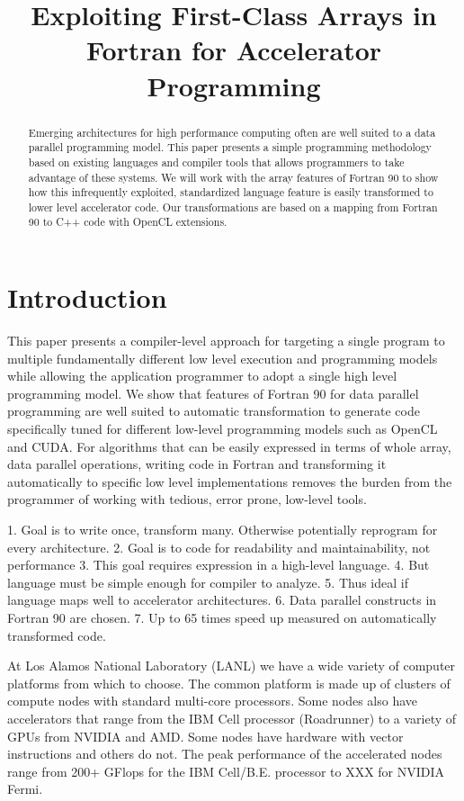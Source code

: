 \documentclass[10pt, conference, compsocconf]{IEEEtran}
\title{Exploiting First-Class Arrays in Fortran for Accelerator Programming}
\author{\IEEEauthorblockN{Matthew J. Sottile}
\IEEEauthorblockA{Galois, Inc.\\
421 SW 6th Ave. Suite 300 \\
Portland, OR 97204\\
Email: matt@galois.com}
\and
\IEEEauthorblockN{Craig E Rasmussen}
\IEEEauthorblockA{Los Alamos National Laboratory\\
CCS-7, MS B287\\
Los Alamos, NM\\
Email: rasmussn@lanl.gov}
}
\begin{document}
\maketitle

\begin{abstract}
Emerging architectures for high performance computing often are well
suited to a data parallel programming model.  This paper presents a
simple programming methodology based on existing languages and compiler
tools that allows programmers to take advantage of these systems.
We will work with the array features of Fortran 90 to show how this
infrequently exploited, standardized language feature is easily
transformed to lower level accelerator code.  Our transformations are
based on a mapping from Fortran 90 to C++ code with OpenCL extensions.
\end{abstract}



\section{Introduction}

This paper presents a compiler-level approach for targeting a single
program to multiple fundamentally different low level execution and
programming models while allowing the application programmer to adopt
a single high level programming model.  We show that features of
Fortran 90 for data parallel programming are well suited to automatic
transformation to generate code specifically tuned for different
low-level programming models such as OpenCL and CUDA.  For algorithms
that can be easily expressed in terms of whole array, data parallel operations,
writing code in Fortran and transforming it automatically to specific low
level implementations removes the burden from the programmer of working
with tedious, error prone, low-level tools.

1. Goal is to write once, transform many. Otherwise potentially reprogram for every architecture.
2. Goal is to code for readability and maintainability, not performance
3. This goal requires expression in a high-level language.
4. But language must be simple enough for compiler to analyze.
5. Thus ideal if language maps well to accelerator architectures.
6. Data parallel constructs in Fortran 90 are chosen.
7. Up to 65 times speed up measured on automatically transformed code.

At Los Alamos National Laboratory (LANL) we have a wide variety of computer
platforms from which to choose.  The common platform is made up of clusters of
compute nodes with standard multi-core processors.  Some nodes also have
accelerators that range from the IBM Cell processor (Roadrunner) to a variety
of GPUs from NVIDIA and AMD.  Some nodes have hardware with vector
instructions and others do not. The peak
performance of the accelerated nodes range from 200+ GFlops for the IBM Cell/B.E.
processor to XXX for NVIDIA Fermi. %
\end{document}
